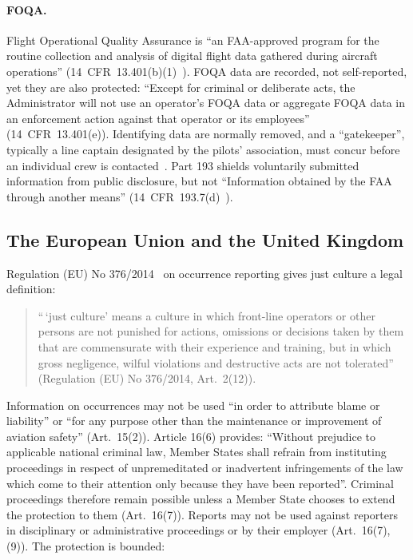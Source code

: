 \documentclass[11pt]{article}
\begin{document}
\paragraph{FOQA.} Flight Operational Quality Assurance is ``an FAA-approved program for the routine collection and analysis of digital flight data gathered during aircraft operations'' (14~CFR~13.401(b)(1)~\cite{cfr13401}). FOQA data are recorded, not self-reported, yet they are also protected: ``Except for criminal or deliberate acts, the Administrator will not use an operator's FOQA data or aggregate FOQA data in an enforcement action against that operator or its employees'' (14~CFR~13.401(e)). Identifying data are normally removed, and a ``gatekeeper'', typically a line captain designated by the pilots' association, must concur before an individual crew is contacted~\cite[para.~6.b(5)]{faa2004}. Part 193 shields voluntarily submitted information from public disclosure, but not ``Information obtained by the FAA through another means'' (14~CFR~193.7(d)~\cite{cfr1937}).

\subsection{The European Union and the United Kingdom}\label{sec:eu}

Regulation (EU) No 376/2014~\cite{eu376} on occurrence reporting gives just culture a legal definition:

\begin{quote}
``\,`just culture' means a culture in which front-line operators or other persons are not punished for actions, omissions or decisions taken by them that are commensurate with their experience and training, but in which gross negligence, wilful violations and destructive acts are not tolerated'' (Regulation (EU) No 376/2014, Art.~2(12)).
\end{quote}

Information on occurrences may not be used ``in order to attribute blame or liability'' or ``for any purpose other than the maintenance or improvement of aviation safety'' (Art.~15(2)). Article 16(6) provides: ``Without prejudice to applicable national criminal law, Member States shall refrain from instituting proceedings in respect of unpremeditated or inadvertent infringements of the law which come to their attention only because they have been reported''. Criminal proceedings therefore remain possible unless a Member State chooses to extend the protection to them (Art.~16(7)). Reports may not be used against reporters in disciplinary or administrative proceedings or by their employer (Art.~16(7), (9)). The protection is bounded:
\end{document}
